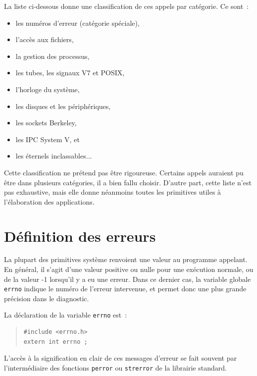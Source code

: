 \documentclass [twoside] {report}
\begin{document}
La liste ci-dessous donne une classification de
ces appels par catégorie. Ce sont~:

\begin {itemize}
    \item les numéros d'erreur (catégorie spéciale),
    \item l'accès aux fichiers,
    \item la gestion des processus,
    \item les tubes, les signaux V7 et POSIX,
    \item l'horloge du système,
    \item les disques et les périphériques,
    \item les sockets Berkeley,
    \item les IPC System V, et
    \item les éternels inclassables...
\end {itemize}

Cette classification ne prétend pas être
rigoureuse. Certains appels auraient pu être dans
plusieurs catégories, il a bien fallu choisir.
D'autre part, cette liste n'est pas exhaustive,
mais elle donne néanmoins toutes les primitives
utiles à l'élaboration des applications.




\section {Définition des erreurs}


La plupart des primitives système renvoient une valeur au programme
appelant. En général, il s'agit d'une valeur
positive ou nulle pour une exécution normale, ou
de la valeur -1 lorsqu'il y a eu une erreur. Dans
ce dernier cas, la variable globale \texttt {errno}
indique le numéro de l'erreur intervenue, et
permet donc une plus grande précision dans le
diagnostic.

La déclaration de la variable \texttt {errno} est~:

\begin {quote}
\begin {verbatim}
#include <errno.h>
extern int errno ;
\end{verbatim}
\end {quote}

L'accès à la signification en clair de ces
messages d'erreur se fait souvent par
l'intermédiaire des fonctions \texttt {perror}
ou \texttt {strerror} de la
librairie standard.
\end{document}

